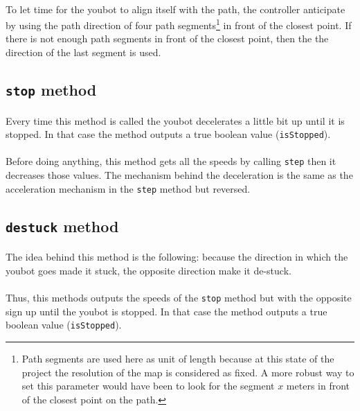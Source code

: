 \documentclass[12pt,a4paper]{article}
\begin{document}
\paragraph{} To let time for the youbot to align itself with the path, the controller anticipate by using the path direction of four path segments\footnote{Path segments are used here as unit of length because at this state of the project the resolution of the map is considered as fixed. A more robust way to set this parameter would have been to look for the segment $x$ meters in front of the closest point on the path.} in front of the closest point. If there is not enough path segments in front of the closest point, then the the direction of the last segment is used.

\subsection{\texttt{stop} method}
\paragraph{} Every time this method is called the youbot decelerates a little bit up until it is stopped. In that case the method outputs a true boolean value (\texttt{isStopped}).

\paragraph{} Before doing anything, this method gets all the speeds by calling \texttt{step} then it decreases those values. The mechanism behind the deceleration is the same as the acceleration mechanism in the \texttt{step} method but reversed.

\subsection{\texttt{destuck} method}
\paragraph{} The idea behind this method is the following: because the direction in which the youbot goes made it stuck, the opposite direction make it de-stuck.

\paragraph{} Thus, this methods outputs the speeds of the \texttt{stop} method but with the opposite sign up until the youbot is stopped. In that case the method outputs a true boolean value (\texttt{isStopped}).
\end{document}
